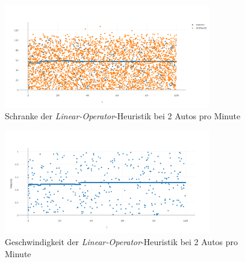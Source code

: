\begin{figure}[H]
	\includegraphics[width=0.8\textwidth]{analyse/SingleMutant/linopzt2.png}
	\caption{Schranke der \emph{Linear-Operator}-Heuristik bei 2 Autos pro Minute}\label{fig:ap_sm_loz_2}
\end{figure}
\begin{figure}[H]
	\includegraphics[width=0.8\textwidth]{analyse/SingleMutant/linopa2.png}
	\caption{Geschwindigkeit der \emph{Linear-Operator}-Heuristik bei 2 Autos pro Minute}\label{fig:ap_sm_loa_2}
\end{figure}

